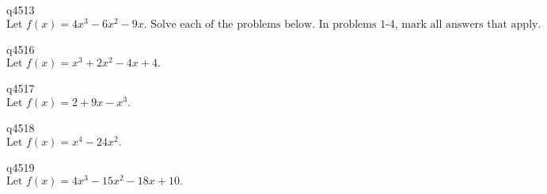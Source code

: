 q4513\\
\(\displaystyle \text{Let } f(x) = 4x^3 - 6x^2 - 9x. \text{ Solve each of the problems below. In problems 1-4, mark all answers that apply.} \)

q4516\\
\(\displaystyle \text{Let } f(x) = x^3 + 2x^2 - 4x + 4. \)

q4517\\
\(\displaystyle \text{Let } f(x) = 2 + 9x - x^3. \)

q4518\\
\(\displaystyle \text{Let } f(x) = x^4 - 24x^2. \)

q4519\\
\(\displaystyle \text{Let } f(x) = 4x^3 - 15x^2 - 18x + 10. \)

